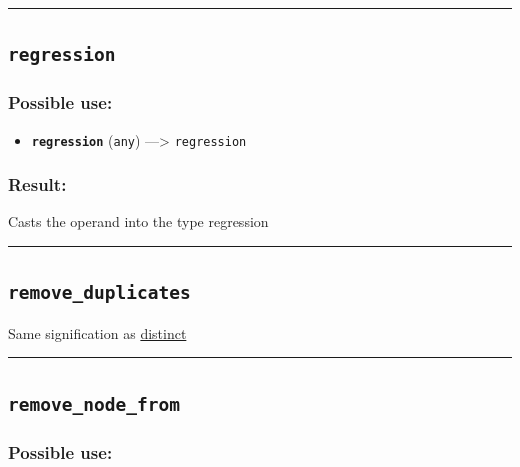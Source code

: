 \documentclass[]{book}
\providecommand{\tightlist}{%
  \setlength{\itemsep}{0pt}\setlength{\parskip}{0pt}}
\theoremstyle{definition}
\theoremstyle{definition}
\theoremstyle{definition}
\theoremstyle{remark}
\begin{document}
\begin{center}\rule{0.5\linewidth}{\linethickness}\end{center}

\subsection{\texorpdfstring{\texttt{regression}}{regression}}\label{regression}

\subsubsection{Possible use:}\label{possible-use-431}

\begin{itemize}
\tightlist
\item
  \textbf{\texttt{regression}} (\texttt{any}) ---\textgreater{}
  \texttt{regression}
\end{itemize}

\subsubsection{Result:}\label{result-417}

Casts the operand into the type regression

\begin{center}\rule{0.5\linewidth}{\linethickness}\end{center}

\subsection{\texorpdfstring{\texttt{remove\_duplicates}}{remove\_duplicates}}\label{remove_duplicates}

Same signification as \href{operators-d-to-h.html\#distinct}{distinct}

\begin{center}\rule{0.5\linewidth}{\linethickness}\end{center}

\subsection{\texorpdfstring{\texttt{remove\_node\_from}}{remove\_node\_from}}\label{remove_node_from}

\subsubsection{Possible use:}\label{possible-use-432}
\end{document}

